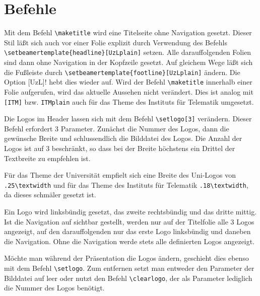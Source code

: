 \documentclass[a4paper,DIV=calc, oneside]{scrartcl}
\newcommand{\cmd}[1]{\marginpar{\color{UzLcolor}\textrm{#1}}}
\begin{document}
\section{Befehle}
Mit dem Befehl \lstinline!\maketitle!\cmd{\textbackslash maketitle} wird eine Titelseite ohne Navigation gesetzt. Dieser Stil läßt sich auch vor einer Folie explizit durch Verwendung des Befehls\\ \lstinline!\setbeamertemplate{headline}[UzLplain]!\cmd{[UzLplain]} setzen. Alle darauffolgenden Folien sind dann ohne Navigation in der Kopfzeile gesetzt. Auf gleichem Wege läßt sich die Fußleiste durch \lstinline!\setbeamertemplate{footline}[UzLplain]! ändern. Die Option \lstinline!![UzL]! hebt dies wieder auf.
Wird der Befehl \lstinline!\maketitle! innerhalb einer Folie aufgerufen, wird das aktuelle Aussehen nicht verändert. Dies ist analog mit \lstinline![ITM]! bzw. \lstinline!ITMplain! auch für das Theme des Instituts für Telematik umgesetzt.

Die Logos im Header lassen sich mit dem Befehl \lstinline!\setlogo[3]!\cmd{\textbackslash setlogo} verändern. Dieser Befehl erfordert 3 Parameter. Zunächst die Nummer des Logos, dann die gewünsche Breite und schlussendlich die Bilddatei des Logos. Die Anzahl der Logos ist auf 3 beschränkt, so dass bei der Breite höchstens ein Drittel der Textbreite zu empfehlen ist.

Für das Theme der Universität empfielt sich eine Breite des Uni-Logos von \lstinline!.25\textwidth! und für das Theme des Instituts für Telematik \lstinline!.18\textwidth!, da dieses schmäler gesetzt ist.

Ein Logo wird linksbündig gesetzt, das zweite rechtsbündig und das dritte mittig. Ist die Navigation auf sichtbar gestellt, werden nur auf der Titelfolie alle 3 Logos angezeigt, auf den darauffolgenden nur das erste Logo linksbündig und daneben die Navigation. Ohne die Navigation werde stets alle definierten Logos angezeigt.

Möchte man während der Präsentation die Logos ändern, geschieht dies ebenso mit dem Befehl \lstinline!\setlogo!. Zum entfernen setzt man entweder den Parameter der Bilddatei auf leer oder nutzt den Befehl \lstinline!\clearlogo!\cmd{\textbackslash clearlogo}, der als Parameter lediglich die Nummer des Logos benötigt.
\end{document}
